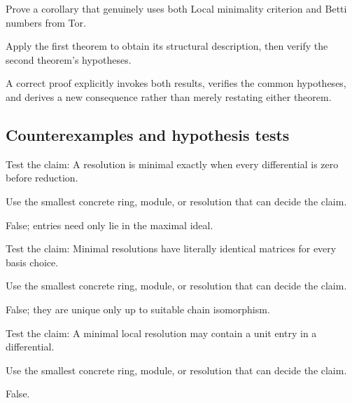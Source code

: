 \begin{exercise}\label{exr:v25-expand-09}
Prove a corollary that genuinely uses both Local minimality criterion and Betti numbers from Tor.
\end{exercise}
\begin{hint}
Apply the first theorem to obtain its structural description, then verify the second theorem's hypotheses.
\end{hint}
\begin{solution}
A correct proof explicitly invokes both results, verifies the common hypotheses, and derives a new consequence rather than merely restating either theorem.
\end{solution}

\subsection*{Counterexamples and hypothesis tests}

\begin{exercise}\label{exr:v25-expand-10}
Test the claim: A resolution is minimal exactly when every differential is zero before reduction.
\end{exercise}
\begin{hint}
Use the smallest concrete ring, module, or resolution that can decide the claim.
\end{hint}
\begin{solution}
False; entries need only lie in the maximal ideal.
\end{solution}

\begin{exercise}\label{exr:v25-expand-11}
Test the claim: Minimal resolutions have literally identical matrices for every basis choice.
\end{exercise}
\begin{hint}
Use the smallest concrete ring, module, or resolution that can decide the claim.
\end{hint}
\begin{solution}
False; they are unique only up to suitable chain isomorphism.
\end{solution}

\begin{exercise}\label{exr:v25-expand-12}
Test the claim: A minimal local resolution may contain a unit entry in a differential.
\end{exercise}
\begin{hint}
Use the smallest concrete ring, module, or resolution that can decide the claim.
\end{hint}
\begin{solution}
False.
\end{solution}

